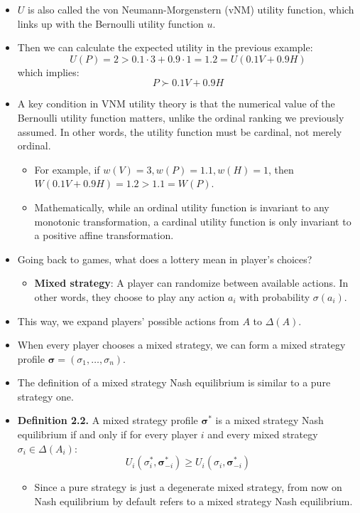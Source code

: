 \documentclass[notitlepage]{article}
\begin{document}
\begin{itemize}
    \item \(U\) is also called the von Neumann-Morgenstern (vNM) utility function, which links up with the Bernoulli utility function \(u\).
    \item Then we can calculate the expected utility in the previous example:
    \[
    U(P) = 2 > 0.1\cdot3 + 0.9\cdot1 = 1.2 = U(0.1V+0.9H)
    \]
    which implies:
    \[
    P \succ 0.1V + 0.9H
    \]
    \item A key condition in VNM utility theory is that the numerical value of the Bernoulli utility function matters, unlike the ordinal ranking we previously assumed. In other words, the utility function must be cardinal, not merely ordinal.
    \begin{itemize}
        \item For example, if \(w(V)=3,w(P)=1.1,w(H)=1\), then \(W(0.1V+0.9H) = 1.2 > 1.1 = W(P)\).
        \item Mathematically, while an ordinal utility function is invariant to any monotonic transformation, a cardinal utility function is only invariant to a positive affine transformation.
    \end{itemize}
    \item Going back to games, what does a lottery mean in player's choices?
    \begin{itemize}
        \item \textbf{Mixed strategy}: A player can randomize between available actions. In other words, they choose to play any action \(a_i\) with probability \(\sigma(a_i)\).
    \end{itemize}
    \item This way, we expand players' possible actions from \(A\) to \(\Delta(A)\).
    \item When every player chooses a mixed strategy, we can form a mixed strategy profile \(\boldsymbol{\sigma} = (\sigma_1, \dots, \sigma_n)\).
    \item The definition of a mixed strategy Nash equilibrium is similar to a pure strategy one.
    \item \textbf{Definition 2.2.} A mixed strategy profile \(\boldsymbol{\sigma}^*\) is a mixed strategy Nash equilibrium if and only if for every player \(i\) and every mixed strategy \(\sigma_i \in \Delta(A_i)\):
    \[
    U_i(\sigma^*_i,\boldsymbol{\sigma}^*_{-i}) \ge U_i(\sigma_i,\boldsymbol{\sigma}^*_{-i})
    \]
    \begin{itemize}
        \item Since a pure strategy is just a degenerate mixed strategy, from now on Nash equilibrium by default refers to a mixed strategy Nash equilibrium.

\end{itemize}
\end{itemize}
\end{document}
